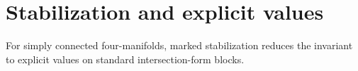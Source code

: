 \section{Stabilization and explicit values}
\label{sec:stable-calculation}

For simply connected four-manifolds, marked stabilization reduces the
invariant to explicit values on standard intersection-form blocks.




